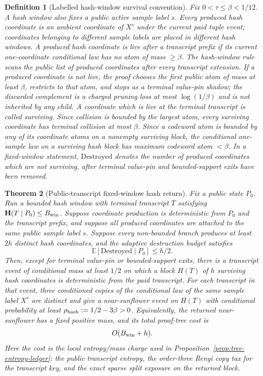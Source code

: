 \documentclass[11pt]{article}
\newtheorem{theorem}{Theorem}[section]
\newtheorem{definition}[theorem]{Definition}
\newcommand{\EE}{\mathbb E}
\newcommand{\bfH}{\mathbf H}
\begin{document}
\begin{definition}[Labelled hash-window survival convention]
\label{def:hash-survival}
Fix $0<\tau\le\beta<1/12$.  A hash window also fixes a public active sample
label $s$.  Every produced hash coordinate is an ambient coordinate of $X^s$
under the current paid tuple event; coordinates belonging to different sample
labels are placed in different hash windows.  A produced hash coordinate is
live after a transcript prefix if its current one-coordinate conditional law
has no atom of mass $\ge\beta$.  The hash-window rule scans the public list of
produced coordinates after every transcript extension.  If a produced
coordinate is not live, the proof chooses the first public atom of mass at
least $\beta$, restricts to that atom, and stops as a terminal value-pin
shadow; the discarded complement is a charged pruning loss at most
\(\log(1/\beta)\) and is not inherited by any child.  A coordinate which is
live at the terminal transcript is called surviving.
Since collision is bounded by the largest atom, every surviving coordinate
has terminal collision at most $\beta$.  Since a codeword atom is bounded by
any of its coordinate atoms on a nonempty surviving block, the conditional
one-sample law on a surviving hash block has maximum codeword atom $<\beta$.
In a fixed-window statement,
$\mathrm{Destroyed}$ denotes the number of produced coordinates which are not
surviving, after terminal value-pin and bounded-support exits have been
removed.
\end{definition}

\begin{theorem}[Public-transcript fixed-window hash return]
\label{thm:public-hash}
Fix a public state $P_0$.  Run a bounded hash window with terminal transcript
$T$ satisfying $\bfH(T\mid P_0)\le B_{\rm win}$.  Suppose coordinate
production is deterministic from $P_0$ and the transcript prefix, and suppose
all produced coordinates are attached to the same public sample label $s$.
Suppose every non-bounded branch produces at least $2h$ distinct hash
coordinates, and the adaptive destruction budget satisfies
\[
  \EE[\mathrm{Destroyed}\mid P_0]\le h/2.
\]
Then, except for terminal value-pin or bounded-support exits, there is a
transcript event of conditional mass at least $1/2$ on which a block $H(T)$ of
$h$ surviving hash coordinates is deterministic from the paid transcript.  For
each transcript in that event, three conditioned copies of the conditional law
of the same sample label $X^s$ are distinct and give a near-sunflower event on
$H(T)$ with conditional probability at least
$\rho_{\rm hash}:=1/2-3\beta>0$.  Equivalently, the returned
near-sunflower has a fixed positive mass, and its total proof-tree cost is
\[
  O(B_{\rm win}+h).
\]
Here the cost is the local entropy/mass charge used in
Proposition~\ref{prop:tree-entropy-ledger}: the public transcript entropy,
the order-three Renyi copy tax for the transcript key, and the exact sparse
split exposure on the returned block.
\end{theorem}
\end{document}
